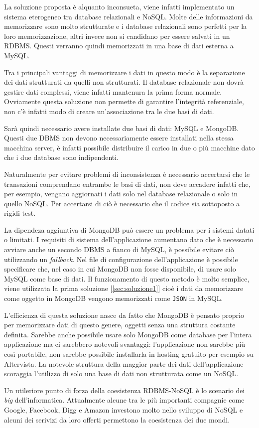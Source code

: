 La soluzione proposta è alquanto inconsueta, viene infatti implementato un sistema eterogeneo tra database relazionali e NoSQL. Molte delle informazioni da memorizzare sono molto strutturate e i database relazionali sono perfetti per la loro memorizzazione, altri invece non si candidano per essere salvati in un RDBMS. Questi verranno quindi memorizzati in una base di dati esterna a MySQL.

Tra i principali vantaggi di memorizzare i dati in questo modo è la separazione dei dati strutturati da quelli non strutturati. Il database relazionale non dovrà gestire dati complessi, viene infatti mantenura la prima forma normale. Ovviamente questa soluzione non permette di garantire l'integrità referenziale, non c'è infatti modo di creare un'associazione tra le due basi di dati. 

Sarà quindi necessario avere installate due basi di dati: MySQL e MongoDB. Questi due DBMS non devono necessariamente essere installati nella stessa macchina server, è infatti possibile distribuire il carico in due o più macchine dato che i due database sono indipendenti. 

Naturalmente per evitare problemi di inconsistenza è necessario accertarsi che le transazioni comprendano entrambe le basi di dati, non deve accadere infatti che, per esempio, vengano aggiornati i dati solo nel database relazionale o solo in quello NoSQL. Per accertarsi di ciò è necessario che il codice sia sottoposto a rigidi test.

La dipendeza aggiuntiva di MongoDB può essere un problema per i sistemi datati o limitati. I requisiti di sistema dell'applicazione aumentano dato che è necessario avviare anche un secondo DBMS a fianco di MySQL, è possibile evitare ciò utilizzando un \emph{fallback}. Nel file di configurazione dell'applicazione è possibile specificare che, nel caso in cui MongoDB non fosse disponibile, di usare solo MySQL come base di dati. Il funzionamento di questo metodo è molto semplice, viene utilizzata la prima soluzione [\ref{sec:soluzione1}] cioè i dati da memorizzare come oggetto in MongoDB vengono memorizzati come \texttt{JSON} in MySQL.

L'efficienza di questa soluzione nasce da fatto che MongoDB è pensato proprio per memorizzare dati di questo genere, oggetti senza una struttura costante definita. Sarebbe anche possibile usare solo MongoDB come database per l'intera applicazione ma ci sarebbero notevoli svantaggi: l'applicazione non sarebbe più così portabile, non sarebbe possibile installarla in hosting gratuito per esempio su Altervista. La notevole struttura della maggior parte dei dati dell'applicazione scoraggia l'utilizzo di solo una base di dati non strutturata come un NoSQL.

Un utileriore punto di forza della coesistenza RDBMS-NoSQL è lo scenario dei \emph{big} dell'informatica. Attualmente alcune tra le più importanti compagnie come Google, Facebook, Digg e Amazon investono molto nello sviluppo di NoSQL\cite{rdbmsnosql} e alcuni dei serivizi da loro offerti permettono la coesistenza dei due mondi.